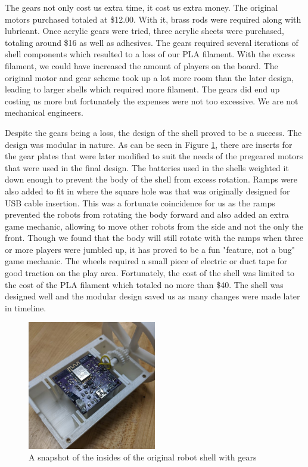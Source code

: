 \documentclass[11pt]{ieeeconf}
\begin{document}
The gears not only cost us extra time, it cost us extra money. The original motors purchased totaled at \$12.00. With it, brass rods were required along with lubricant. Once acrylic gears were tried, three acrylic sheets were purchased, totaling around \$16 as well as adhesives. The gears required several iterations of shell components which resulted to a loss of our PLA filament. With the excess filament, we could have increased the amount of players on the board. The original motor and gear scheme took up a lot more room than the later design, leading to larger shells which required more filament. The gears did end up costing us more but fortunately the expenses were not too excessive. We are not mechanical engineers.

Despite the gears being a loss, the design of the shell proved to be a success. The design was modular in nature. As can be seen in Figure \ref{shell}, there are inserts for the gear plates that were later modified to suit the needs of the pregeared motors that were used in the final design. The batteries used in the shells weighted it down enough to prevent the body of the shell from excess rotation. Ramps were also added to fit in where the square hole was that was originally designed for USB cable insertion. This was a fortunate coincidence for us as the ramps prevented the robots from rotating the body forward and also added an extra game mechanic, allowing to move other robots from the side and not the only the front. Though we found that the body will still rotate with the ramps when three or more players were jumbled up, it has proved to be a fun "feature, not a bug" game mechanic. The wheels required a small piece of electric or duct tape for good traction on the play area. Fortunately, the cost of the shell was limited to the cost of the PLA filament which totaled no more than \$40. The shell was designed well and the modular design saved us as many changes were made later in timeline. 

\begin{figure}[H]
\centering
\captionsetup{justification=centering}
\includegraphics[width=0.5\textwidth]{images/Shell.png}
\caption{A snapshot of the insides of the original robot shell with gears}
\label{shell}
\end{figure}
\end{document}
